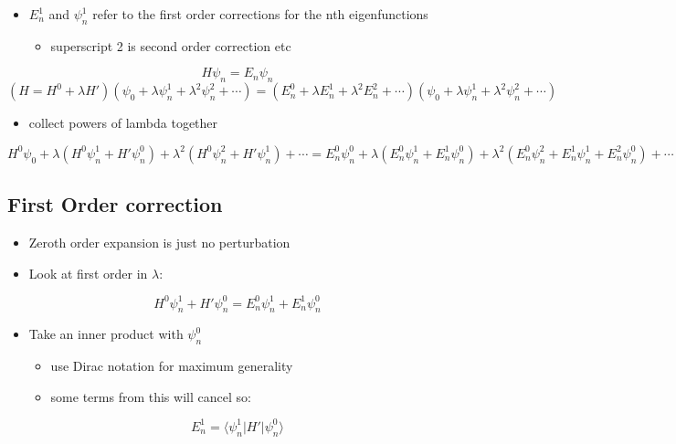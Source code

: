 \documentclass[a4paper,11pt,normalem]{article}
\begin{document}
\begin{itemize}
\item
  \(E_{n}^1\) and \(\psi_{n}^1\) refer to the first order corrections
  for the nth eigenfunctions
  \begin{itemize}
  \item
    superscript 2 is second order correction etc
  \end{itemize}
\end{itemize}

\[
    H\psi_n = E_{n}\psi_n \] \[
    (H = H^0 + \lambda H')(\psi_{0} + \lambda \psi_{n}^1 + \lambda^2 \psi_{n}^2 + \cdots) = ( E_{n}^0 + \lambda E_{n}^1 + \lambda^2 E_{n}^2 + \cdots)(\psi_0 + \lambda \psi_{n}^1 + \lambda^2 \psi_{n}^2 + \cdots)
\]

\begin{itemize}
\item
  collect powers of lambda together
\end{itemize}

\[
    H^0\psi_0 + \lambda(H^0\psi_{n}^1 + H'\psi_{n}^0) + \lambda^2 (H^0 \psi_{n}^2 + H'\psi_{n}^1) + \cdots = E_{n}^0\psi_{n}^0 + \lambda(E_{n}^0\psi_{n}^1 + E_{n}^1\psi_{n}^0) + \lambda^2(E_{n}^0\psi_{n}^2 + E_{n}^1\psi_{n}^1 + E_{n}^2\psi_{n}^0) + \cdots
\]

\subsection{First Order correction}\label{first-order-correction}

\begin{itemize}
\item
  Zeroth order expansion is just no perturbation
\item
  Look at first order in \(\lambda\):
\end{itemize}

\[
    H^0\psi_{n}^1 + H'\psi_{n}^0 = E_{n}^0\psi_{n}^1 + E_{n}^1\psi_{n}^0
\]

\begin{itemize}
\item
  Take an inner product with \(\psi_{n}^0\)
  \begin{itemize}
  \item
    use Dirac notation for maximum generality
  \item
    some terms from this will cancel so:
  \end{itemize}
\end{itemize}

\[
    E_{n}^1 = \langle \psi_{n}^1 | H' | \psi_{n}^0 \rangle
\]
\end{document}
